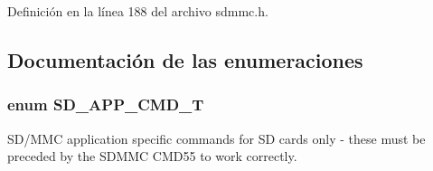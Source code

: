 Definición en la línea 188 del archivo sdmmc.\+h.



\subsection{Documentación de las enumeraciones}
\subsubsection[{\texorpdfstring{S\+D\+\_\+\+A\+P\+P\+\_\+\+C\+M\+D\+\_\+T}{SD_APP_CMD_T}}]{\setlength{\rightskip}{0pt plus 5cm}enum {\bf S\+D\+\_\+\+A\+P\+P\+\_\+\+C\+M\+D\+\_\+T}}\hypertarget{group___c_h_i_p___s_d_m_m_c___definitions_ga1bf27ef97c5e846aa2b0f8372583502a}{}\label{group___c_h_i_p___s_d_m_m_c___definitions_ga1bf27ef97c5e846aa2b0f8372583502a}


S\+D/\+M\+MC application specific commands for SD cards only -\/ these must be preceded by the S\+D\+M\+MC C\+M\+D55 to work correctly. 


